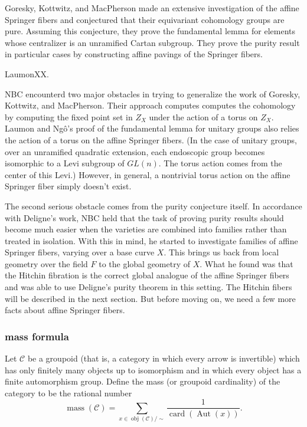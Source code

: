 \documentclass[brochure,english,12pt]{bourbaki}
\def\op#1{{\operatorname{#1}}}
\def\mass{\op{mass}}
\def\C{{\mathcal C}}
\begin{document}
Goresky, Kottwitz, and MacPherson made an extensive investigation of
the affine Springer fibers and conjectured that their equivariant
cohomology groups are pure.  Assuming this conjecture, they prove the
fundamental lemma for elements whose centralizer is an unramified
Cartan subgroup.  They prove the purity result in particular cases by
constructing affine pavings of the Springer fibers.

LaumonXX.

NBC encounterd two major obstacles in trying to generalize the work of
Goresky, Kottwitz, and MacPherson.  Their approach computes computes
the cohomology by computing the fixed point set in $Z_X$ under the
action of a torus on $Z_X$.  Laumon and Ng\^o's proof of the
fundamental lemma for unitary groups also relies the action of a torus
on the affine Springer fibers.  (In the case of unitary groups, over
an unramified quadratic extension, each endoscopic group becomes
isomorphic to a Levi subgroup of $GL(n)$.  The torus action comes from
the center of this Levi.)  However, in general, a nontrivial torus
action on the affine Springer fiber simply doesn't exist.

The second serious obstacle comes from the purity conjecture itself.
In accordance with Deligne's work, NBC held that the task of proving
purity results should become much easier when the varieties are
combined into families rather than treated in isolation.  With this in
mind, he started to investigate families of affine Springer fibers,
varying over a base curve $X$.  This brings us back from local
geometry over the field $F$ to the global geometry of $X$.  What he
found was that the Hitchin fibration is the correct global analogue of
the affine Springer fibers and was able to use Deligne's  purity theorem in this setting.  
The Hitchin fibers will be described in
the next section.  But before moving on, we need a few more facts
about affine Springer fibers.

\subsubsection{mass formula}

Let ${\C}$ be a groupoid (that is, a category in which every arrow is
invertible) which has only finitely many objects up to isomorphism and
in which every object has a finite automorphism group.  Define the
mass (or groupoid cardinality) of the category to be the rational
number
\[
\mass(\C)= \sum_{x\in \op{obj}(\C)/\sim} \frac{1}{\op{card}(\op{Aut}(x))}.
\]
\end{document}
